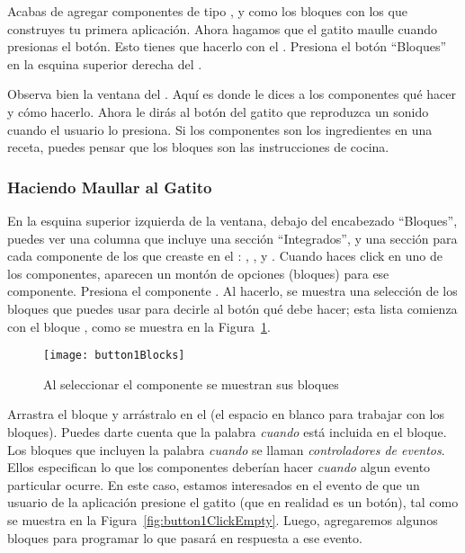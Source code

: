 Acabas de agregar componentes de tipo ,  y  como los bloques con los que construyes tu primera aplicación. Ahora hagamos que el gatito maulle cuando presionas el botón. Esto tienes que hacerlo con el \blockEditor. Presiona el botón ``Bloques'' en la esquina superior derecha del \componentDesigner.

Observa bien la ventana del \blockEditor. Aquí es donde le dices a los componentes qué hacer y cómo hacerlo. Ahora le dirás al botón del gatito que reproduzca un sonido cuando el usuario lo presiona. Si los componentes son los ingredientes en una receta, puedes pensar que los bloques son las instrucciones de cocina.

\subsubsection*{Haciendo Maullar al Gatito}

En la esquina superior izquierda de la ventana, debajo del encabezado ``Bloques'', puedes ver una columna que incluye una sección ``Integrados'', y una sección para cada componente de los que creaste en el \designer: , , y . Cuando haces click en uno de los componentes, aparecen un montón de opciones (bloques) para ese componente. Presiona el componente . Al hacerlo, se muestra una selección de los bloques que puedes usar para decirle al botón qué debe hacer; esta lista comienza con el bloque , como se muestra en la Figura~\ref{fig:button1Blocks}.

\begin{figure}[H]
  \centering
  \texttt{[image: button1Blocks]}
  \caption{Al seleccionar el componente  se muestran sus bloques}
  \label{fig:button1Blocks}
\end{figure}

Arrastra el bloque  y arrástralo en el \viewer (el espacio en blanco para trabajar con los bloques). Puedes darte cuenta que la palabra \emph{cuando} está incluida en el bloque. Los bloques que incluyen la palabra \emph{cuando} se llaman \emph{controladores de  eventos}. Ellos especifican lo que los componentes deberían hacer \emph{cuando} algun evento particular ocurre. En este caso, estamos interesados en el evento de que un usuario de la aplicación presione el gatito (que en realidad es un botón), tal como se muestra en la Figura~\ref{fig:button1ClickEmpty}. Luego, agregaremos algunos bloques para programar lo que pasará en respuesta a ese evento.


